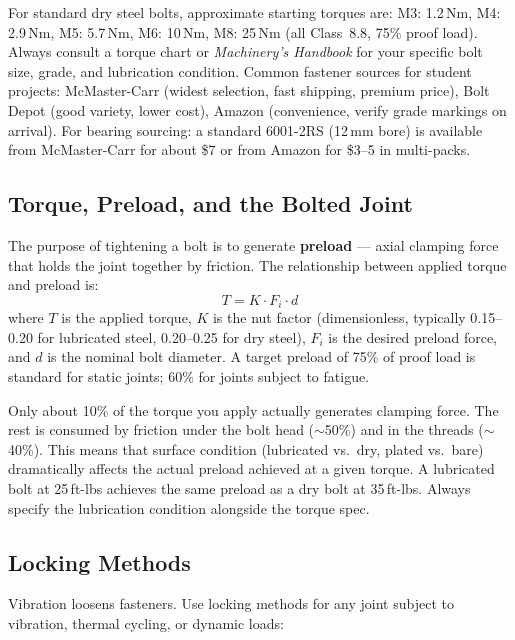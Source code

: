\documentclass[11pt,letterpaper,twoside,openany]{book}
\begin{document}
\begin{tipbox}
For standard dry steel bolts, approximate starting torques are: M3: 1.2\,Nm, M4: 2.9\,Nm, M5: 5.7\,Nm, M6: 10\,Nm, M8: 25\,Nm (all Class~8.8, 75\% proof load). Always consult a torque chart or \emph{Machinery's Handbook} for your specific bolt size, grade, and lubrication condition. Common fastener sources for student projects: McMaster-Carr (widest selection, fast shipping, premium price), Bolt Depot (good variety, lower cost), Amazon (convenience, verify grade markings on arrival). For bearing sourcing: a standard 6001-2RS (12\,mm bore) is available from McMaster-Carr for about \$7 or from Amazon for \$3--5 in multi-packs.
\end{tipbox}

\subsection{Torque, Preload, and the Bolted Joint}
The purpose of tightening a bolt is to generate \textbf{preload} --- axial clamping force that holds the joint together by friction. The relationship between applied torque and preload is:
\begin{equation}
T = K \cdot F_i \cdot d
\end{equation}
where $T$ is the applied torque, $K$ is the nut factor (dimensionless, typically 0.15--0.20 for lubricated steel, 0.20--0.25 for dry steel), $F_i$ is the desired preload force, and $d$ is the nominal bolt diameter. A target preload of 75\% of proof load is standard for static joints; 60\% for joints subject to fatigue.

\begin{warningbox}
Only about 10\% of the torque you apply actually generates clamping force. The rest is consumed by friction under the bolt head ($\sim$50\%) and in the threads ($\sim$40\%). This means that surface condition (lubricated vs.\ dry, plated vs.\ bare) dramatically affects the actual preload achieved at a given torque. A lubricated bolt at 25\,ft-lbs achieves the same preload as a dry bolt at 35\,ft-lbs. Always specify the lubrication condition alongside the torque spec.
\end{warningbox}

\subsection{Locking Methods}
Vibration loosens fasteners. Use locking methods for any joint subject to vibration, thermal cycling, or dynamic loads:
\end{document}
